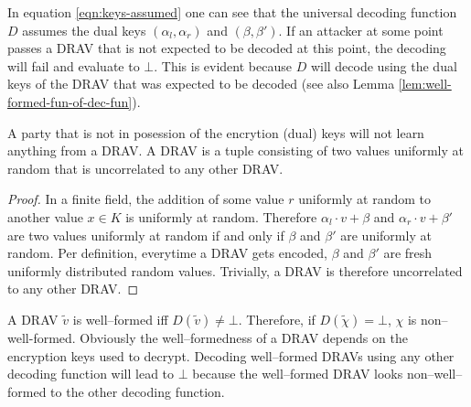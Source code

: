 \noindent{}In equation \ref{eqn:keys-assumed} one can see that the universal
decoding function $D$ assumes the dual keys $(\alpha_l, \alpha_r)$ and $(\beta,
\beta')$. If an attacker at some point passes a DRAV that is not expected to be
decoded at this point, the decoding will fail and evaluate to $\bot$. This is
evident because $D$ will decode using the dual keys of the DRAV that was
expected to be decoded (see also Lemma \ref{lem:well-formed-fun-of-dec-fun}).

\begin{lem}
  \label{lem:DRAV-random}

  A party that is not in posession of the encrytion (dual) keys will not learn
  anything from a DRAV. A DRAV is a tuple consisting of two values uniformly at
  random that is uncorrelated to any other DRAV.

\end{lem}
\begin{proof}

  In a finite field, the addition of some value $r$ uniformly at random to
  another value $x \in K$ is uniformly at random. Therefore $\alpha_l \cdot v +
  \beta$ and $\alpha_r \cdot v + \beta'$ are two values uniformly at random if
  and only if $\beta$ and $\beta'$ are uniformly at random. Per definition,
  everytime a DRAV gets encoded, $\beta$ and $\beta'$ are fresh uniformly
  distributed random values. Trivially, a DRAV is therefore uncorrelated to any
  other DRAV.

\end{proof}



A DRAV $\widetilde{v}$ is well--formed iff $D(\widetilde{v}) \neq \bot$.
Therefore, if $D(\widetilde{\chi}) = \bot$, $\chi$ is non--well-formed.
Obviously the well--formedness of a DRAV depends on the encryption keys used to
decrypt. Decoding well--formed DRAVs using any other decoding function will
lead to $\bot$ because the well--formed DRAV looks non--well--formed to the
other decoding function.


